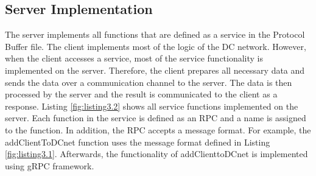 \subsection{Server Implementation}
The server implements all functions that are defined as a service in the Protocol Buffer file. The client implements most of the logic of the DC network. However, when the client accesses a service, most of the service functionality is implemented on the server. Therefore, the client prepares all necessary data and sends the data over a communication channel to the server. The data is then processed by the server and the result is communicated to the client as a response. Listing \ref{fig:listing3.2} shows all service functions implemented on the server. %
Each function in the service is defined as an RPC and a name is assigned to the function. In addition, the RPC accepts a message format. For example, the addClientToDCnet function uses the message format defined in Listing \ref{fig:listing3.1}. Afterwards, the functionality of addClienttoDCnet is implemented using gRPC framework.
\\


\\ %
